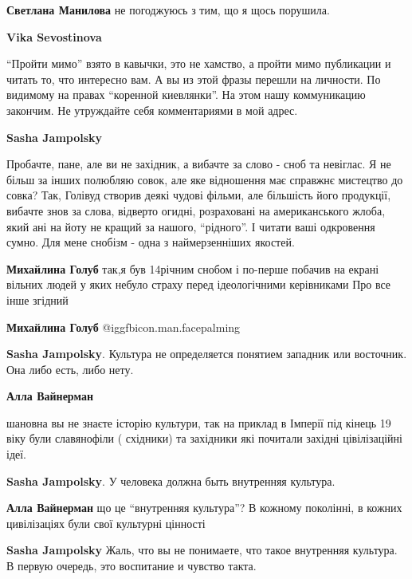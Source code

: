 \begin{itemize}
\begin{itemize}
\begin{itemize}
\textbf{Светлана Манилова} не погоджуюсь з тим, що я щось порушила.

\textbf{Vika Sevostinova}

\enquote{Пройти мимо} взято в кавычки, это не хамство, а пройти мимо публикации и
читать то, что интересно вам. А вы из этой фразы перешли на личности. По
видимому на правах \enquote{коренной киевлянки}. На этом нашу коммуникацию закончим. Не
утруждайте себя комментариями в мой адрес.

\end{itemize} %

\textbf{Sasha Jampolsky} 

Пробачте, пане, але ви не західник, а вибачте за слово - сноб та невіглас. Я не
більш за інших полюбляю совок, але яке відношення має справжнє мистецтво до
совка? Так, Голівуд створив деякі чудові фільми, але більшість його продукції,
вибачте знов за слова, відверто огидні, розраховані на американського жлоба,
який ані на йоту не кращий за нашого, \enquote{рідного}. І читати ваші одкровення
сумно. Для мене снобізм - одна з наймерзенніших якостей.

\begin{itemize} %
\textbf{Михайлина Голуб} так,я був 14річним снобом і по-перше побачив на екрані вільних людей у яких небуло страху перед ідеологічними керівниками
Про все інше згідний

\textbf{Михайлина Голуб}  @igg{fbicon.man.facepalming} 
\end{itemize} %

\textbf{Sasha Jampolsky}. Культура не определяется понятием западник или
восточник. Она либо есть, либо нету.

\begin{itemize} %
\textbf{Алла Вайнерман} 

шановна вы не знаєте історію культури, так на приклад в Імперії під кінець 19
віку були славянофіли ( східники) та західники які почитали західні
цівілізаційні ідеї.

\textbf{Sasha Jampolsky}. У человека должна быть внутренняя культура.

\textbf{Алла Вайнерман} що це \enquote{внутренняя культура}? В кожному поколінні, в кожних цивілізаціях були свої культурні цінності

\textbf{Sasha Jampolsky} Жаль, что вы не понимаете, что такое внутренняя культура. В первую очередь, это воспитание и чувство такта.
\end{itemize} %


\end{itemize}
\end{itemize}
